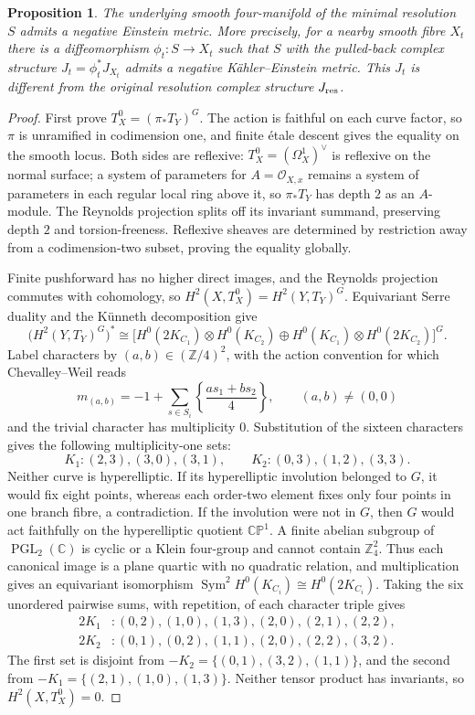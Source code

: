 \documentclass[a4paper,11pt]{article}
\numberwithin{equation}{section}
\newtheorem{proposition}[theorem]{Proposition}
\theoremstyle{definition}
\newcommand{\CP}{\mathbb{CP}}
\newcommand{\Z}{\mathbb Z}
\begin{document}
\begin{proposition}\label{prop:bcgp-smooth-einstein}
The underlying smooth four-manifold of the minimal resolution $S$ admits a negative Einstein metric.
More precisely, for a nearby smooth fibre $X_t$ there is a diffeomorphism $\phi_t:S\to X_t$
such that $S$ with the pulled-back complex structure $J_t=\phi_t^*J_{X_t}$ admits a negative K\"ahler--Einstein metric.
This $J_t$ is different from the original resolution complex structure $J_{\rm res}$.
\end{proposition}
\begin{proof}
First prove $T_X^0=(\pi_*T_Y)^G$.
The action is faithful on each curve factor, so $\pi$ is unramified in codimension one, and finite \'etale descent gives the equality on the smooth locus.
Both sides are reflexive: $T_X^0=(\Omega_X^1)^\vee$ is reflexive on the normal surface;
a system of parameters for $A=\mathcal O_{X,x}$ remains a system of parameters in each regular local ring above it,
so $\pi_*T_Y$ has depth $2$ as an $A$-module.
The Reynolds projection splits off its invariant summand, preserving depth $2$ and torsion-freeness.
Reflexive sheaves are determined by restriction away from a codimension-two subset, proving the equality globally.

Finite pushforward has no higher direct images, and the Reynolds projection commutes with cohomology, so
$H^2(X,T_X^0)=H^2(Y,T_Y)^G$.
Equivariant Serre duality and the K\"unneth decomposition give
\[
\bigl(H^2(Y,T_Y)^G\bigr)^*\cong
\bigl[H^0(2K_{C_1})\otimes H^0(K_{C_2})
\oplus H^0(K_{C_1})\otimes H^0(2K_{C_2})\bigr]^G.
\]
Label characters by $(a,b)\in(\Z/4)^2$, with the action convention for which Chevalley--Weil reads
\[
m_{(a,b)}=-1+\sum_{s\in S_i}
\left\{\frac{a s_1+b s_2}{4}\right\},\qquad (a,b)\ne(0,0)
\]
and the trivial character has multiplicity $0$.
Substitution of the sixteen characters gives the following multiplicity-one sets:
\[
K_1:(2,3),(3,0),(3,1),\qquad
K_2:(0,3),(1,2),(3,3).
\]
Neither curve is hyperelliptic. If its hyperelliptic involution belonged to $G$, it would fix eight points,
whereas each order-two element fixes only four points in one branch fibre, a contradiction.
If the involution were not in $G$, then $G$ would act faithfully on the hyperelliptic quotient $\CP^1$.
A finite abelian subgroup of $\operatorname{PGL}_2(\mathbb C)$ is cyclic or a Klein four-group and cannot contain $\Z_4^2$.
Thus each canonical image is a plane quartic with no quadratic relation,
and multiplication gives an equivariant isomorphism $\operatorname{Sym}^2H^0(K_{C_i})\cong H^0(2K_{C_i})$.
Taking the six unordered pairwise sums, with repetition, of each character triple gives
\begin{align*}
2K_1&:(0,2),(1,0),(1,3),(2,0),(2,1),(2,2),\\
2K_2&:(0,1),(0,2),(1,1),(2,0),(2,2),(3,2).
\end{align*}
The first set is disjoint from $-K_2=\{(0,1),(3,2),(1,1)\}$,
and the second from $-K_1=\{(2,1),(1,0),(1,3)\}$.
Neither tensor product has invariants, so $H^2(X,T_X^0)=0$.


\end{proof}
\end{document}
